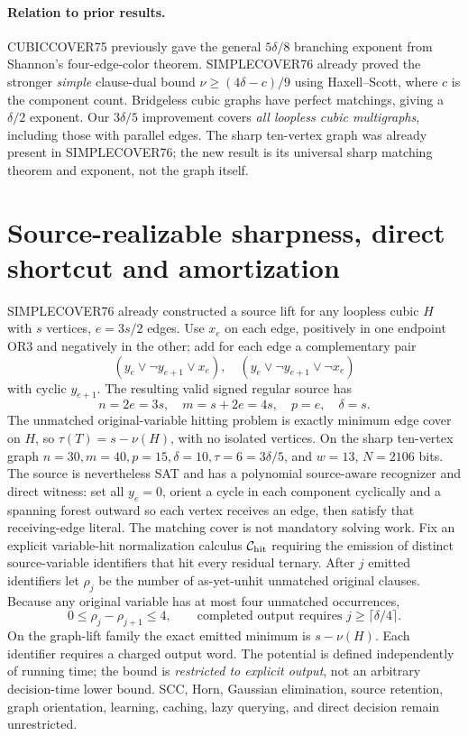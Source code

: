 \documentclass[11pt]{article}
\begin{document}
\paragraph{Relation to prior results.}
CUBICCOVER75 previously gave the general $5\delta/8$ branching exponent from Shannon's four-edge-color theorem. SIMPLECOVER76 already proved the stronger \emph{simple} clause-dual bound $\nu\ge(4\delta-c)/9$ using Haxell--Scott, where $c$ is the component count. Bridgeless cubic graphs have perfect matchings, giving a $\delta/2$ exponent. Our $3\delta/5$ improvement covers \emph{all loopless cubic multigraphs}, including those with parallel edges. The sharp ten-vertex graph was already present in SIMPLECOVER76; the new result is its universal sharp matching theorem and exponent, not the graph itself.
\section{Source-realizable sharpness, direct shortcut and amortization}
SIMPLECOVER76 already constructed a source lift for any loopless cubic $H$ with $s$ vertices, $e=3s/2$ edges. Use $x_e$ on each edge, positively in one endpoint OR3 and negatively in the other; add for each edge a complementary pair
\[
(y_e\vee\neg y_{e+1}\vee x_e),\quad
(y_e\vee\neg y_{e+1}\vee\neg x_e)
\]
with cyclic $y_{e+1}$. The resulting valid signed regular source has
\[
n=2e=3s,\quad m=s+2e=4s,\quad p=e,\quad\delta=s.
\]
The unmatched original-variable hitting problem is exactly minimum edge cover on $H$, so $\tau(T)=s-\nu(H)$, with no isolated vertices. On the sharp ten-vertex graph $n=30,m=40,p=15,\delta=10,\tau=6=3\delta/5$, and $w=13$, $N=2106$ bits. The source is nevertheless SAT and has a polynomial source-aware recognizer and direct witness: set all $y_e=0$, orient a cycle in each component cyclically and a spanning forest outward so each vertex receives an edge, then satisfy that receiving-edge literal. The matching cover is not mandatory solving work.
Fix an explicit variable-hit normalization calculus $\mathcal C_{\rm hit}$ requiring the emission of distinct source-variable identifiers that hit every residual ternary. After $j$ emitted identifiers let $\rho_j$ be the number of as-yet-unhit unmatched original clauses. Because any original variable has at most four unmatched occurrences,
\[
0\le\rho_j-\rho_{j+1}\le4,\qquad
\text{completed output requires }j\ge\lceil\delta/4\rceil.
\]
On the graph-lift family the exact emitted minimum is $s-\nu(H)$. Each identifier requires a charged output word. The potential is defined independently of running time; the bound is \emph{restricted to explicit output}, not an arbitrary decision-time lower bound. SCC, Horn, Gaussian elimination, source retention, graph orientation, learning, caching, lazy querying, and direct decision remain unrestricted.
\end{document}
